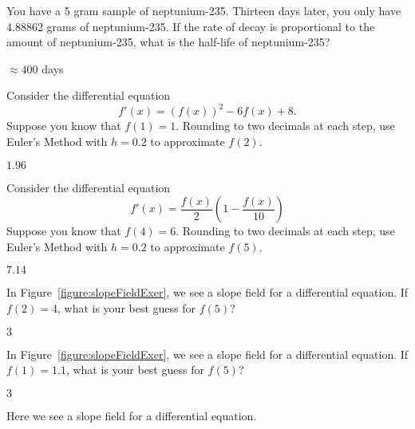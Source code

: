 \begin{exercises}
\begin{exercise}
You have a 5 gram sample of neptunium-235. Thirteen days later, you only
have 4.88862 grams of neptunium-235. If the rate of decay is proportional
to the amount of neptunium-235, what is the half-life of neptunium-235?
\begin{answer}
$\approx 400$ days
\end{answer}
\end{exercise}

\begin{exercise}
Consider the differential equation
\[
f'(x) = \left(f(x)\right)^2 - 6f(x) + 8.
\]
Suppose you know that $f(1)= 1$. Rounding to two decimals at each
step, use Euler's Method with $h=0.2$ to approximate $f(2)$. 
\begin{answer}
$1.96$
\end{answer}
\end{exercise}

\begin{exercise}
Consider the differential equation
\[
f'(x) = \frac{f(x)}{2}\left(1-\frac{f(x)}{10}\right)
\]
Suppose you know that $f(4)= 6$. Rounding to two decimals at each
step, use Euler's Method with $h=0.2$ to approximate $f(5)$.
\begin{answer}
$7.14$
\end{answer}
\end{exercise}





\begin{exercise}
In Figure~\ref{figure:slopeFieldExer}, we see a slope field for a
differential equation. If $f(2)=4$, what is your best guess for
$f(5)$?
\begin{answer}
$3$
\end{answer}
\end{exercise}

\begin{exercise}
In Figure~\ref{figure:slopeFieldExer}, we see a slope field for a
differential equation. If $f(1)=1.1$, what is your best guess for
$f(5)$?
\begin{answer}
$3$
\end{answer}
\end{exercise}
\begin{marginfigure}
{\def\length{sqrt(1+(-y^2+4*y-3)^2)}
}
\caption{Here we see a slope field for a differential equation.}
\label{figure:slopeFieldExer}
\end{marginfigure}

\end{exercises}
